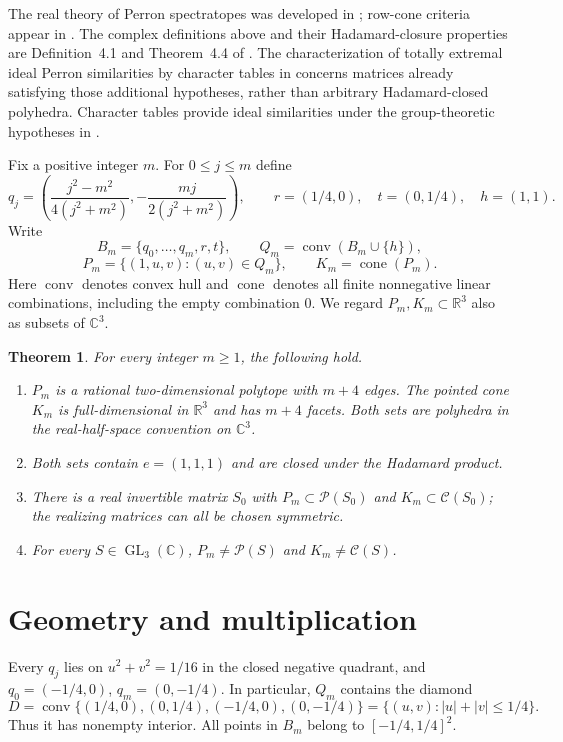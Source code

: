 \documentclass[11pt,a4paper]{article}
\newtheorem{theorem}{Theorem}
\newcommand{\R}{\mathbb R}
\newcommand{\C}{\mathbb C}
\newcommand{\conv}{\operatorname{conv}}
\newcommand{\cone}{\operatorname{cone}}
\begin{document}
The real theory of Perron spectratopes was developed in \cite{JP16}; row-cone
criteria appear in \cite{JP17}. The complex definitions above and their
Hadamard-closure properties are Definition~4.1 and Theorem~4.4 of
\cite{JP25}. The characterization of totally extremal ideal Perron
similarities by character tables in \cite[Corollary~3.4]{AP26} concerns
matrices already satisfying those additional hypotheses, rather than arbitrary
Hadamard-closed polyhedra. Character tables provide ideal similarities
under the group-theoretic hypotheses in \cite{GLP26}.

Fix a positive integer $m$. For $0\leq j\leq m$ define
\[
 q_j=\left(\frac{j^2-m^2}{4(j^2+m^2)},
             -\frac{mj}{2(j^2+m^2)}\right),\qquad
 r=(1/4,0),\quad t=(0,1/4),\quad h=(1,1).
\]
Write
\[
 B_m=\{q_0,\ldots,q_m,r,t\},\qquad Q_m=\conv(B_m\cup\{h\}),
\]
\[
 P_m=\{(1,u,v):(u,v)\in Q_m\},\qquad K_m=\cone(P_m).
\]
Here $\conv$ denotes convex hull and $\cone$ denotes all finite nonnegative
linear combinations, including the empty combination $0$.
We regard $P_m,K_m\subset\R^3$ also as subsets of $\C^3$.

\begin{theorem}\label{thm:main}
For every integer $m\geq1$, the following hold.
\begin{enumerate}
\item $P_m$ is a rational two-dimensional polytope with $m+4$ edges.
The pointed cone $K_m$ is full-dimensional in $\R^3$ and has $m+4$ facets.
Both sets are polyhedra in the real-half-space convention on $\C^3$.
\item Both sets contain $e=(1,1,1)$ and are closed under the Hadamard product.
\item There is a real invertible matrix $S_0$ with
$P_m\subset\mathcal P(S_0)$ and $K_m\subset\mathcal C(S_0)$; the
realizing matrices can all be chosen symmetric.
\item For every $S\in\operatorname{GL}_3(\C)$,
$P_m\ne\mathcal P(S)$ and $K_m\ne\mathcal C(S)$.
\end{enumerate}
\end{theorem}

\section{Geometry and multiplication}
Every $q_j$ lies on $u^2+v^2=1/16$ in the closed negative quadrant, and
$q_0=(-1/4,0)$, $q_m=(0,-1/4)$. In particular, $Q_m$ contains the diamond
\begin{equation}\label{eq:diamond}
 D=\conv\{(1/4,0),(0,1/4),(-1/4,0),(0,-1/4)\}
   =\{(u,v):|u|+|v|\leq1/4\}.
\end{equation}
Thus it has nonempty interior. All points in $B_m$ belong to
$[-1/4,1/4]^2$.
\end{document}
